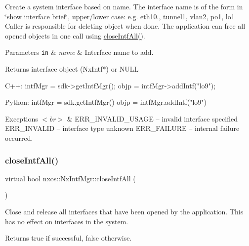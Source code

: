 Create a system interface based on name. The interface name is of the form in \char`\"{}show interface brief\char`\"{}, upper/lower case\+: e.\+g. eth10., tunnel1, vlan2, po1, lo1 Caller is responsible for deleting object when done. The application can free all opened objects in one call using \mbox{\hyperlink{classnxos_1_1_nx_intf_mgr_a45e7cb2a8e3919667c14264dd618168a}{close\+Intf\+All()}}. 
\begin{DoxyParams}[1]{Parameters}
\mbox{\tt in}  & {\em name} & Interface name to add. \\
\hline
\end{DoxyParams}
\begin{DoxyReturn}{Returns}
interface object (Nx\+Intf$\ast$) or N\+U\+LL
\end{DoxyReturn}

\begin{DoxyCode}
C++:
   intfMgr = sdk->getIntfMgr();
   objp = intfMgr->addIntf(\textcolor{stringliteral}{"lo9"});

Python:
   intfMgr = sdk.getIntfMgr()
   objp = intfMgr.addIntf(\textcolor{stringliteral}{"lo9"})
\end{DoxyCode}



\begin{DoxyExceptions}{Exceptions}
{\em $<$br$>$} & E\+R\+R\+\_\+\+I\+N\+V\+A\+L\+I\+D\+\_\+\+U\+S\+A\+GE -- invalid interface specified E\+R\+R\+\_\+\+I\+N\+V\+A\+L\+ID -- interface type unknown E\+R\+R\+\_\+\+F\+A\+I\+L\+U\+RE -- internal failure occurred. \\
\hline
\end{DoxyExceptions}
\mbox{\label{classnxos_1_1_nx_intf_mgr_a45e7cb2a8e3919667c14264dd618168a}} 
\subsubsection{\texorpdfstring{close\+Intf\+All()}{closeIntfAll()}}
{\footnotesize\ttfamily virtual bool nxos\+::\+Nx\+Intf\+Mgr\+::close\+Intf\+All (\begin{DoxyParamCaption}{ }\end{DoxyParamCaption})\hspace{0.3cm}{\ttfamily [pure virtual]}}

Close and release all interfaces that have been opened by the application. This has no effect on interfaces in the system. ~\newline
 \begin{DoxyReturn}{Returns}
true if successful, false otherwise.
\end{DoxyReturn}

